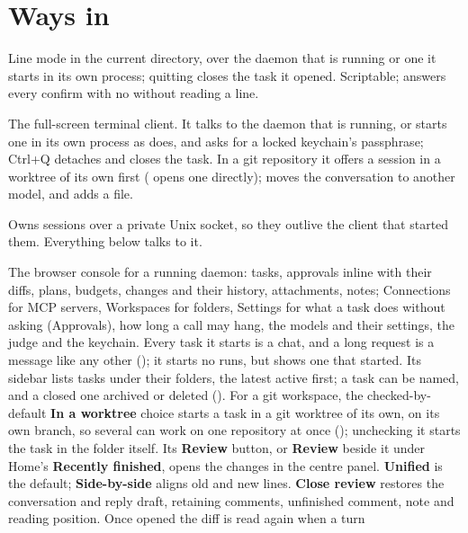 \chapter{Ways in}

\begin{description}[leftmargin=2.2em]
\item[\code{nodwyn}] Line mode in the current directory, over the daemon
  that is running or one it starts in its own process; quitting closes the
  task it opened. Scriptable;  answers every confirm
  with no without reading a line.
\item[\code{nodwyn tui}] The full-screen terminal client. It talks to the
  daemon that is running, or starts one in its own process as
   does, and asks for a locked keychain's passphrase;
  Ctrl+Q detaches and  closes the task. In a git
  repository it offers a session in a worktree of its own first
  ( opens one directly);  moves the
  conversation to another model, and  adds a file.
\item[\code{nodwyn daemon}] Owns sessions over a private Unix socket, so
  they outlive the client that started them. Everything below talks to it.
\item[\code{nodwyn ui}] The browser console for a running daemon: tasks,
  approvals inline with their diffs, plans, budgets, changes and their
  history, attachments, notes; Connections for MCP servers, Workspaces for
  folders, Settings for what a task does without asking (Approvals), how
  long a call may hang, the models and their settings, the judge and the keychain. Every task
  it starts is a chat, and a long request is a message like any other
  (); it starts no runs, but shows one that 
  started. Its sidebar lists tasks under their folders, the latest active
  first; a task can be named, and a closed one archived or deleted
  (). For a git workspace, the checked-by-default
  \textbf{In a worktree} choice starts a task in a git worktree of its own,
  on its own branch, so several can work on one repository at once ();
  unchecking it starts the task in the folder itself. Its \textbf{Review}
  button, or \textbf{Review} beside it under Home's \textbf{Recently finished},
  opens the changes in the centre panel. \textbf{Unified} is the default;
  \textbf{Side-by-side} aligns old and new lines. \textbf{Close review} restores
  the conversation and reply draft, retaining comments, unfinished comment,
  note and reading position. Once opened the diff is read again when a turn

\end{description}

